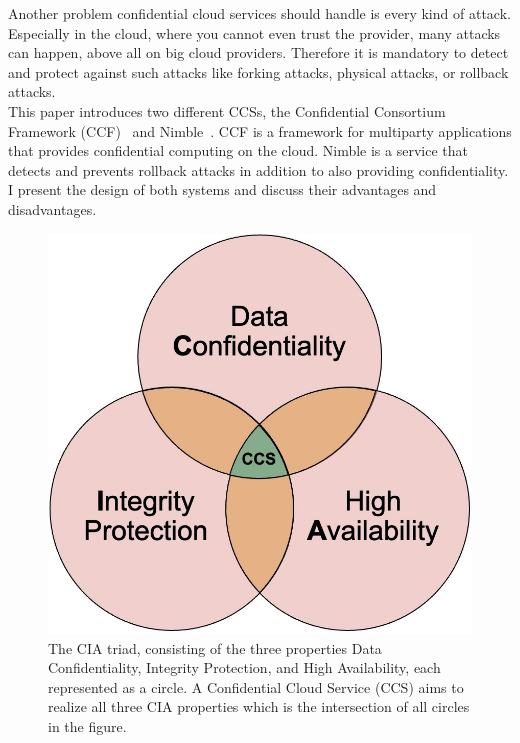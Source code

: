  Another problem confidential cloud services should handle is every kind of attack. Especially in the cloud, where you cannot even trust the provider, many attacks can happen, above all on big cloud providers. Therefore it is mandatory to detect and protect against such attacks like forking attacks, physical attacks, or rollback attacks.\\
 This paper introduces two different CCSs, the Confidential Consortium Framework (CCF)~\cite{Howard} and Nimble~\cite{Nimble}. CCF is a framework for multiparty applications that provides confidential computing on the cloud. Nimble is a service that detects and prevents rollback attacks in addition to also providing confidentiality. I present the design of both systems and discuss their advantages and disadvantages.
	 
 \begin{figure}[t]
	\includegraphics[scale=0.17]{pictures/cia_new}
	\caption{The CIA triad, consisting of the three properties Data Confidentiality, Integrity Protection, and High Availability, each represented as a circle. A Confidential Cloud Service (CCS) aims to realize all three CIA properties which is the intersection of all circles in the figure.  }
	\label{cia}
\end{figure}